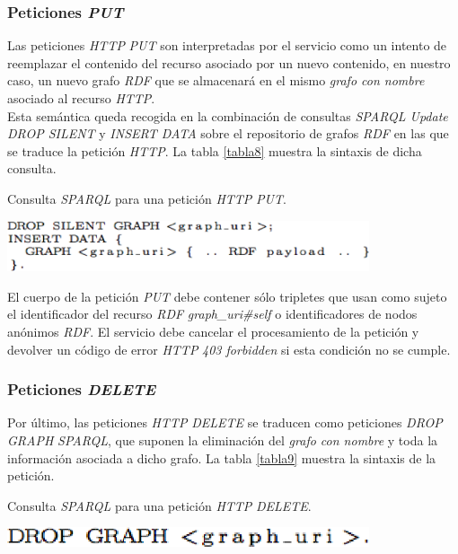\subsubsection{Peticiones \textit{PUT}}

Las peticiones \textit{HTTP} \textit{PUT} son interpretadas por el servicio como un intento de reemplazar el contenido del recurso asociado por un nuevo contenido, en nuestro caso, un nuevo grafo \textit{RDF} que se almacenar\'a en el mismo \textit{grafo con nombre} asociado al recurso \textit{HTTP}.\\
Esta sem\'antica queda recogida en la combinaci\'on de consultas \textit{SPARQL Update} \textit{DROP SILENT} y \textit{INSERT DATA} sobre el repositorio de grafos \textit{RDF} en las que se traduce la petici\'on \textit{HTTP}. La tabla \ref{tabla8} muestra la sintaxis de dicha consulta.\\

\begin{table}
\vspace{2.4in}
\caption{Consulta \textit{SPARQL} para una petici\'on \textit{HTTP} \textit{PUT}.}
\includegraphics[width=0.8\textwidth]{tabla8}
\label{tabla8}
\end{table}

El cuerpo de la petici\'on \textit{PUT} debe contener s\'olo tripletes que usan como sujeto el identificador del recurso \textit{RDF} \textit{graph\_uri\#self} o identificadores de nodos an\'onimos \textit{RDF}. El servicio debe cancelar el procesamiento de la petici\'on y devolver un c\'odigo de error \textit{HTTP} \textit{403 forbidden} si esta condici\'on no se cumple.

\subsubsection{Peticiones \textit{DELETE}}

Por \'ultimo, las peticiones \textit{HTTP} \textit{DELETE} se traducen como peticiones \textit{DROP GRAPH} \textit{SPARQL}, que suponen la eliminaci\'on del \textit{grafo con nombre} y toda la informaci\'on asociada a dicho grafo. La tabla \ref{tabla9} muestra la sintaxis de la petici\'on.\\

\begin{table}
\vspace{2.4in}
\caption{Consulta \textit{SPARQL} para una petici\'on \textit{HTTP} \textit{DELETE}.}
\includegraphics[width=0.8\textwidth]{tabla9}
\label{tabla9}
\end{table}


